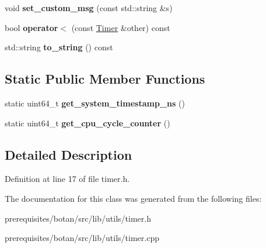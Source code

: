 \begin{DoxyCompactItemize}
\item 
\mbox{\label{class_botan_1_1_timer_a6b302fa68f00c7c38a2dacbd074ae4dd}} 
void {\bfseries set\+\_\+custom\+\_\+msg} (const std\+::string \&s)
\item 
\mbox{\label{class_botan_1_1_timer_a0cad6fb37750c526156173a55d17b0d2}} 
bool {\bfseries operator$<$} (const \mbox{\hyperlink{class_botan_1_1_timer}{Timer}} \&other) const
\item 
\mbox{\label{class_botan_1_1_timer_a563324a8fb62bc785051c50a88170130}} 
std\+::string {\bfseries to\+\_\+string} () const
\end{DoxyCompactItemize}
\subsection*{Static Public Member Functions}
\begin{DoxyCompactItemize}
\item 
\mbox{\label{class_botan_1_1_timer_aa9975950c54334a4b5f7eef6311c8b15}} 
static uint64\+\_\+t {\bfseries get\+\_\+system\+\_\+timestamp\+\_\+ns} ()
\item 
\mbox{\label{class_botan_1_1_timer_a2ab6923d7e6b1c17b50d28544a841502}} 
static uint64\+\_\+t {\bfseries get\+\_\+cpu\+\_\+cycle\+\_\+counter} ()
\end{DoxyCompactItemize}


\subsection{Detailed Description}


Definition at line 17 of file timer.\+h.



The documentation for this class was generated from the following files\+:\begin{DoxyCompactItemize}
\item 
prerequisites/botan/src/lib/utils/timer.\+h\item 
prerequisites/botan/src/lib/utils/timer.\+cpp\end{DoxyCompactItemize}
